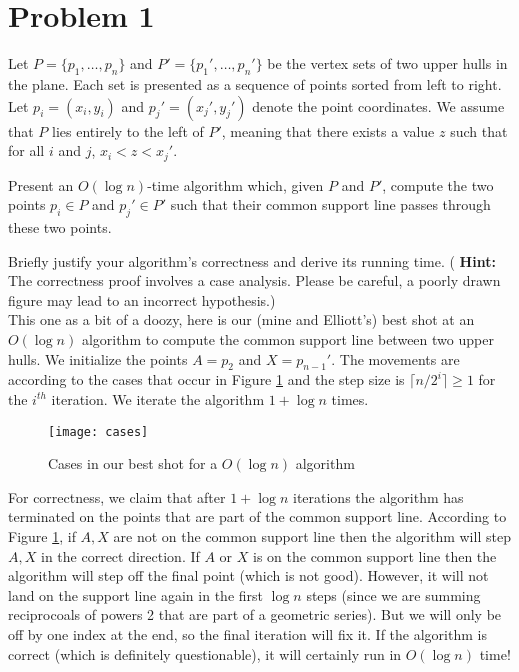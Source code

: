 \documentclass[11pt]{article}
\begin{document}

\newpage
\section*{Problem 1}

Let $P = \{ p_1, \ldots, p_n \}$ and $P' = \{ p_1', \ldots, p_n' \}$ be the
vertex sets of two upper hulls in the plane.  Each set is presented as a
sequence of points sorted from left to right.  Let $p_i = (x_i, y_i)$ and $p_j'
= (x_j', y_j')$ denote the point coordinates.  We assume that $P$ lies entirely
to the left of $P'$, meaning that there exists a value $z$ such that for all
$i$ and $j$, $x_i < z < x_j'$.


Present an $O(\log n)$-time algorithm which, given $P$ and $P'$, compute the two
points $p_i \in P$ and $p_j' \in P'$ such that their common support line passes
through these two points.

Briefly justify your algorithm's correctness and derive its running time.  ({\bf
Hint:} The correctness proof involves a case analysis.  Please be careful, a
poorly drawn figure may lead to an incorrect hypothesis.) \\

\answer
This one as a bit of a doozy, here is our (mine and Elliott's) best shot at an $O(\log n)$ algorithm to compute the common support line between two upper hulls.
We initialize the points $A = p_2$ and $X = p_{n-1}'$.
The movements are according to the cases that occur in Figure \ref{fig:cases} and the step size is $\lceil n/2^i \rceil \geq 1$ for the $i^{th}$ iteration.
We iterate the algorithm $1 + \log n$ times.

\begin{figure}[h]
    \centering
    \texttt{[image: cases]}
    \caption{Cases in our best shot for a $O(\log n)$ algorithm}
    \label{fig:cases}
\end{figure}

For correctness, we claim that after $1 + \log n$ iterations the algorithm has terminated on the points that are part of the common support line.
According to Figure \ref{fig:cases}, if $A,X$ are not on the common support line then the algorithm will step $A,X$ in the correct direction.
If $A$ or $X$ is on the common support line then the algorithm will step off the final point (which is not good).
However, it will not land on the support line again in the first $\log n$ steps (since we are summing reciprocoals of powers 2 that are part of a geometric series).
But we will only be off by one index at the end, so the final iteration will fix it.
If the algorithm is correct (which is definitely questionable), it will certainly run in $O(\log n)$ time!
\end{document}
